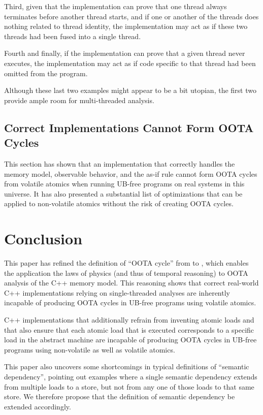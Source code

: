 \documentclass[10]{article}
\begin{document}
Third, given that the implementation can prove that one thread always
terminates before another thread starts, and if one or another of the
threads does nothing related to thread identity, the implementation
may act as if these two threads had been fused into a single thread.

Fourth and finally, if the implementation can prove that a given thread
never executes, the implementation may act as if code specific to that
thread had been omitted from the program.

Although these last two examples might appear to be a bit utopian,
the first two provide ample room for multi-threaded analysis.

\subsection{Correct Implementations Cannot Form OOTA Cycles}
\label{sec:Correct Implementations Cannot Form OOTA Cycles}

This section has shown that an implementation that correctly handles
the memory model, observable behavior, and the as-if rule cannot form
OOTA cycles from volatile atomics when running UB-free programs on real
systems in this universe.
It has also presented a substantial list of optimizations that can be
applied to non-volatile atomics without the risk of creating OOTA cycles.

\section{Conclusion}
\label{sec:Conclusion}

This paper has refined the definition of ``OOTA cycle'' from
 to , which enables the
application the laws of physics (and thus of temporal reasoning) to OOTA
analysis of the C++ memory model.
This reasoning shows that correct real-world C++ implementations relying
on single-threaded analyses are inherently incapable of producing OOTA
cycles in UB-free programs using volatile atomics.

C++ implementations that additionally refrain from inventing atomic loads
and that also ensure that each atomic load that is executed corresponds
to a specific load in the abstract machine are incapable of producing
OOTA cycles in UB-free programs using non-volatile as well
as volatile atomics.

This paper also uncovers some shortcomings in typical definitions of
``semantic dependency'', pointing out examples where a single semantic
dependency extends from multiple loads to a store, but not from any one
of those loads to that same store.
We therefore propose that the definition of semantic dependency be
extended accordingly.
\end{document}

